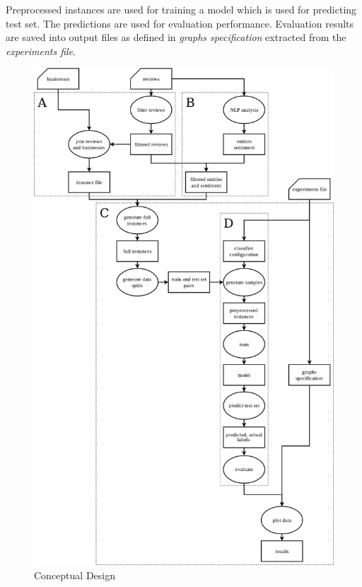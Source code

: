 Preprocessed instances are used for training a model which is used for predicting test set.
The predictions are used for evaluation performance.
Evaluation results are saved into output files as defined in \textit{graphs specification} extracted from
the \textit{experiments file}.


\begin{figure}[h!!]
    \centering
	\includegraphics[width=\textwidth]{figures/conceptual_design.png}
	\caption{Conceptual Design}\label{fig:conceptual_design}
\end{figure}






